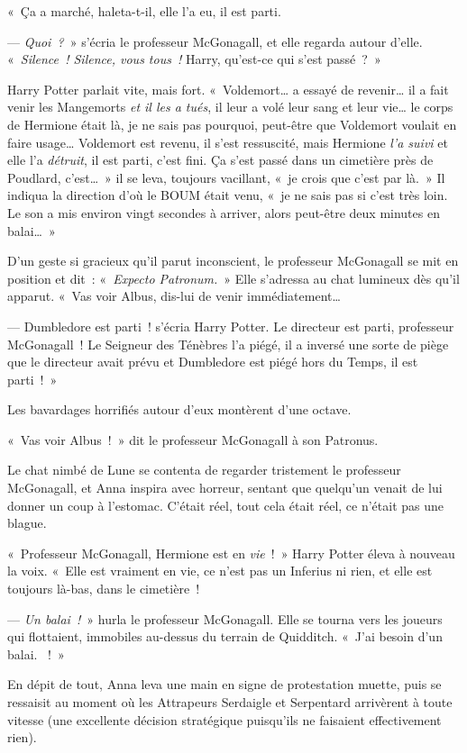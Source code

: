 «~Ça a marché, haleta-t-il, elle l'a eu, il est parti.

--- \emph{Quoi~?}~» s'écria le professeur McGonagall, et elle regarda autour d'elle.
«~\emph{Silence~!
Silence, vous tous~!} Harry, qu'est-ce qui s'est passé~?~»

Harry Potter parlait vite, mais fort.
«~Voldemort… a essayé de revenir… il a fait venir les Mangemorts \emph{et il les a tués}, il leur a volé leur sang et leur vie… le corps de Hermione était là, je ne sais pas pourquoi, peut-être que Voldemort voulait en faire usage…
Voldemort est revenu, il s'est ressuscité, mais Hermione \emph{l'a suivi} et elle l'a \emph{détruit}, il est parti, c'est fini.
Ça s'est passé dans un cimetière près de Poudlard, c'est…~»
il se leva, toujours vacillant, «~je crois que c'est par là.~»
Il indiqua la direction d'où le BOUM était venu, «~je ne sais pas si c'est très loin.
Le son a mis environ vingt secondes à arriver, alors peut-être deux minutes en balai…~»

D'un geste si gracieux qu'il parut inconscient, le professeur McGonagall se mit en position et dit~: «~\emph{Expecto Patronum.}~» Elle s'adressa au chat lumineux dès qu'il apparut.
«~Vas voir Albus, dis-lui de venir immédiatement…

--- Dumbledore est parti~! s'écria Harry Potter.
Le directeur est parti, professeur McGonagall~!
Le Seigneur des Ténèbres l'a piégé, il a inversé une sorte de piège que le directeur avait prévu et Dumbledore est piégé hors du Temps, il est parti~!~»

Les bavardages horrifiés autour d'eux montèrent d'une octave.

«~Vas voir Albus~!~»
dit le professeur McGonagall à son Patronus.

Le chat nimbé de Lune se contenta de regarder tristement le professeur McGonagall, et Anna inspira avec horreur, sentant que quelqu'un venait de lui donner un coup à l'estomac.
C'était réel, tout cela était réel, ce n'était pas une blague.

«~Professeur McGonagall, Hermione est en \emph{vie}~!~»
Harry Potter éleva à nouveau la voix.
«~Elle est vraiment en vie, ce n'est pas un Inferius ni rien, et elle est toujours là-bas, dans le cimetière~!

--- \emph{Un balai~!}~» hurla le professeur McGonagall.
Elle se tourna vers les joueurs qui flottaient, immobiles au-dessus du terrain de Quidditch.
«~J'ai besoin d'un balai.
~!~»

En dépit de tout, Anna leva une main en signe de protestation muette, puis se ressaisit au moment où les Attrapeurs Serdaigle et Serpentard arrivèrent à toute vitesse (une excellente décision stratégique puisqu'ils ne faisaient effectivement rien).

